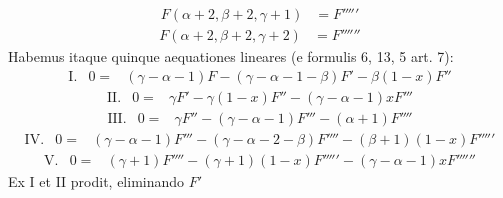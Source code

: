 \[
\begin{array}{rl}
F(\alpha+2,\beta+2,\gamma+1)&=F'''''
\end{array}
\]
\[
\begin{array}{rl}
F(\alpha+2,\beta+2,\gamma+2)&=F''''''
\end{array}
\]
Habemus itaque quinque aequationes lineares (e formulis 6, 13, 5 art. 7):
\[
\begin{array}{rcl}
\mathrm{I.}&0=&(\gamma-\alpha-1)F-(\gamma-\alpha-1-\beta)F'-\beta(1-x)F''
\end{array}
\]
\[
\begin{array}{rcl}
\mathrm{II.}&0=&\gamma F'-\gamma(1-x)F''-(\gamma-\alpha-1)xF'''
\end{array}
\]
\[
\begin{array}{rcl}
\mathrm{III.}&0=&\gamma F''-(\gamma-\alpha-1)F'''-(\alpha+1)F''''
\end{array}
\]
\[
\begin{array}{rcl}
\mathrm{IV.}&0=&(\gamma-\alpha-1)F'''-(\gamma-\alpha-2-\beta)F''''-(\beta+1)(1-x)F'''''
\end{array}
\]
\[
\begin{array}{rcl}
\mathrm{V.}&0=&(\gamma+1)F''''-(\gamma+1)(1-x)F'''''-(\gamma-\alpha-1)xF''''''
\end{array}
\]
Ex I et II prodit, eliminando $F'$

